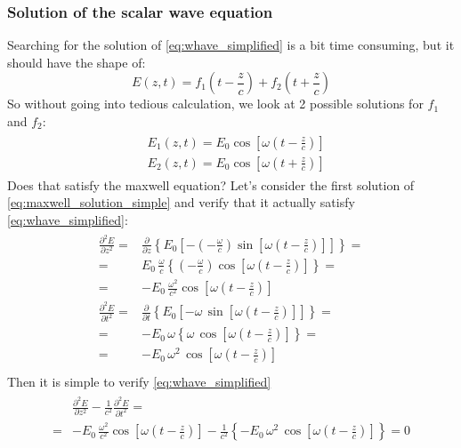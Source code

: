 \subsubsection*{Solution of the scalar wave equation}
Searching for the solution of \cref{eq:whave_simplified} is a bit time consuming, but it should have the shape of:
\begin{equation}
    E(z,t)=f_1\left(t-\frac{z}{c}\right)+f_2\left(t+\frac{z}{c}\right)
\end{equation}
So without going into tedious calculation, we look at 2 possible solutions for $f_1$ and $f_2$:
\begin{align}\label{eq:maxwell_solution_simple}
    \begin{split}
        &E_1(z,t)=E_0 \cos\left[\omega\left(t-\frac{z}{c}\right)\right]\\[5pt]
        &E_2(z,t)=E_0 \cos\left[\omega\left(t+\frac{z}{c}\right)\right]
    \end{split}
\end{align}
Does that satisfy the maxwell equation? Let's consider the first solution of \cref{eq:maxwell_solution_simple} and verify that it actually satisfy \cref{eq:whave_simplified}:
\begin{align*}
    \begin{split}
        \frac{\partial^2E}{\partial z^2}=&\frac{\partial}{\partial z}\left\{E_0\left[-\left(-\frac{\omega}{c}\right)\sin\left[\omega\left(t-\frac{z}{c}\right)\right]\right]\right\}=\\[5pt]
        =&E_0\,\frac{\omega}{c}\left\{\left(-\frac{\omega}{c}\right)\cos\left[\omega\left(t-\frac{z}{c}\right)\right]\right\}=\\[5pt]
        =&-E_0\,\frac{\omega^2}{c^2}\cos\left[\omega\left(t-\frac{z}{c}\right)\right]\\[10pt]
        \frac{\partial^2E}{\partial t^2}=&\frac{\partial}{\partial t}\left\{E_0\left[-\omega\, \sin\left[\omega\left(t-\frac{z}{c}\right)\right]\right]\right\}=\\[5pt]
        =&-E_0\,\omega\left\{\omega \, \cos\left[\omega\left(t-\frac{z}{c}\right)\right]\right\}=\\[5pt]
        =&-E_0\,\omega^2\,\cos\left[\omega\left(t-\frac{z}{c}\right)\right]\\[10pt]
    \end{split}
\end{align*}
Then it is simple to verify \cref{eq:whave_simplified}
\begin{align*}
    \begin{split}
    &\frac{\partial^2E}{\partial z^2}-\frac{1}{c^2} \frac{\partial^2E}{\partial t^2}=\\[5pt]
    =&-E_0\,\frac{\omega^2}{c^2}\cos\left[\omega\left(t-\frac{z}{c}\right)\right]-\frac{1}{c^2}\left\{-E_0\,\omega^2\,\cos\left[\omega\left(t-\frac{z}{c}\right)\right]\right\}=0
    \end{split}
\end{align*}
